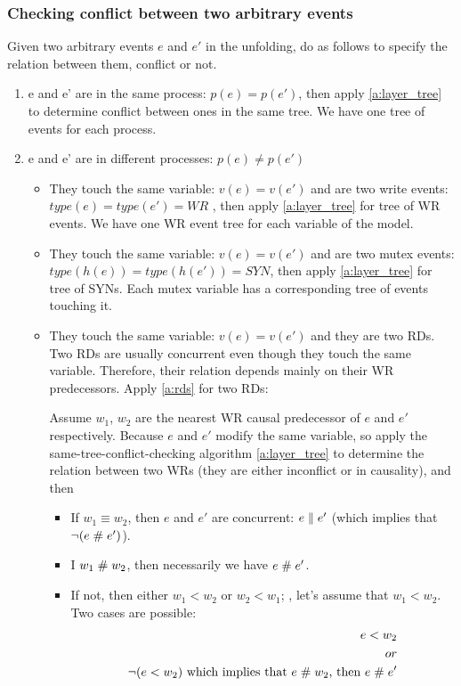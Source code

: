 \documentclass{llncs}
\begin{document}
\subsubsection{Checking conflict between two arbitrary events\\}
\noindent
Given two arbitrary events $e$ and $e'$ in the unfolding, do as follows to specify the relation between them, conflict or not.
\begin{enumerate}
	\item e and e' are in the same process: $p(e) = p(e')$, then apply \cref{a:layer_tree} to determine conflict between ones in the same tree. We have one tree of events for each process.
	\item e and e' are in different processes: $p(e)\neq p(e')$
	\begin{itemize}
		\item
		They touch the same variable: $v(e) = v(e')$ and are two write events: $ type(e) = type(e') = WR$ , then apply \cref{a:layer_tree} for tree of WR events. We have one WR event tree for each variable of the model. 
		\item
		They touch the same variable: $v(e) = v(e')$ and are two mutex events: $ type(h(e)) = type(h(e')) = SYN$, then apply \cref{a:layer_tree} for tree of SYNs. Each mutex variable has  a corresponding tree of events touching it.
		\item
		They touch the same variable: $v(e) = v(e')$ and they are two RDs. Two RDs are usually concurrent even though they touch the same variable. Therefore, their relation depends mainly on their WR predecessors. Apply \cref{a:rds} for two RDs: 
		
		Assume $w_1$, $w_2$ are the nearest WR causal predecessor of $e$ and $e'$ respectively. Because $e$ and $e'$ modify the same variable, so apply the same-tree-conflict-checking algorithm \cref{a:layer_tree} to determine the relation
		between two WRs (they are either inconflict or in causality), and then
		\begin{itemize}
			\item
			If $w_1 \equiv w_2$, then $e$ and $e'$ are concurrent: $e \mathrel{\parallel} e'$ (which implies that $\lnot (e \mathrel{\#} e')$).
			\item
			I $w_1 \mathrel{\#} w_2$, then necessarily we have $e \mathrel{\#} e'$.
			\item
			If not, then either $w_1 < w_2$ or $w_2 < w_1$; \wlogg, let's assume that $w_1 < w_2$.
			Two cases are possible:
			\begin{align}
				e < w_2 \label{ca1} \\
				or \nonumber \\
				\lnot (e < w_2) \text{ which implies that } e \cfl w_2 \text{, then } e \cfl e' \label{ca2}
			\end{align}
			

\end{itemize}
\end{itemize}
\end{enumerate}
\end{document}
